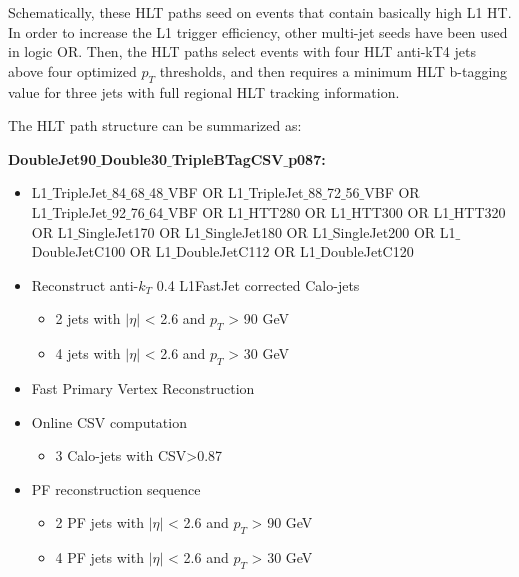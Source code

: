 Schematically, these HLT paths seed on events that contain basically high L1 HT. In order to increase the L1 trigger efficiency, other multi-jet seeds have been used in logic OR. Then, the HLT paths select events with four HLT anti-kT4 jets above four optimized $p_{T}$ thresholds, and then requires a minimum HLT b-tagging value for three jets with full regional HLT tracking information. 

The HLT path structure can be summarized as:

\textbf{DoubleJet90$\_$Double30$\_$TripleBTagCSV$\_$p087:}
\begin{itemize}
	\item L1$\_$TripleJet$\_$84$\_$68$\_$48$\_$VBF OR L1$\_$TripleJet$\_$88$\_$72$\_$56$\_$VBF OR\\ L1$\_$TripleJet$\_$92$\_$76$\_$64$\_$VBF OR L1$\_$HTT280 OR L1$\_$HTT300 OR L1$\_$HTT320 OR L1$\_$SingleJet170 OR L1$\_$SingleJet180 OR L1$\_$SingleJet200 OR L1$\_$DoubleJetC100 OR L1$\_$DoubleJetC112 OR L1$\_$DoubleJetC120
	\item Reconstruct anti-$k_{T}$ 0.4 L1FastJet corrected Calo-jets
	\begin{itemize}
		\item 2 jets with $|\eta|$ < 2.6 and $p_{T}$ > 90 GeV
		\item 4 jets with $|\eta|$ < 2.6 and $p_{T}$ > 30 GeV		
	\end{itemize}
	\item Fast Primary Vertex Reconstruction
	\item Online CSV computation
	\begin{itemize}
		\item 3 Calo-jets with CSV>0.87
	\end{itemize}
	\item PF reconstruction sequence
	\begin{itemize}
		\item 2 PF jets with $|\eta|$ < 2.6 and $p_{T}$ > 90 GeV
		\item 4 PF jets with $|\eta|$ < 2.6 and $p_{T}$ > 30 GeV		
	\end{itemize}
\end{itemize}

